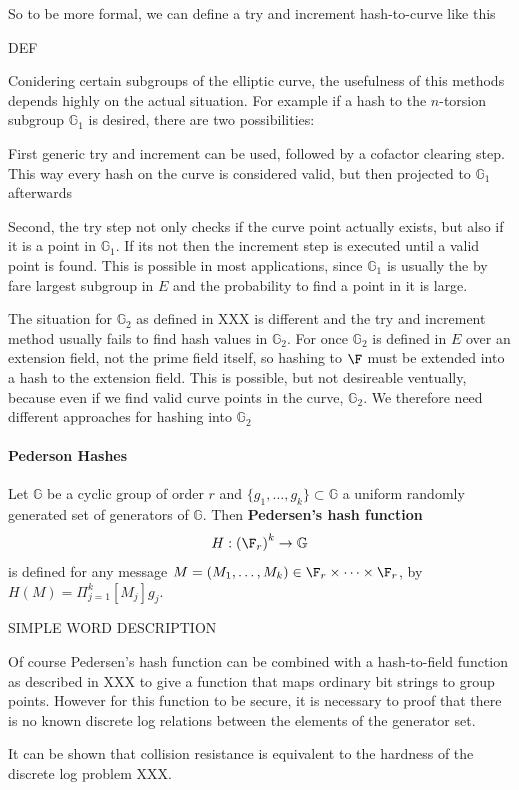 So to be more formal, we can define a try and increment hash-to-curve like this

DEF


Conidering certain subgroups of the elliptic curve, the usefulness of this methods depends highly on the actual situation. For example if a hash to the $n$-torsion subgroup $\mathbb{G}_1$ is desired, there are two possibilities: 

First generic try and increment can be used, followed by a cofactor clearing step. This way every hash on the curve is considered valid, but then projected to $\mathbb{G}_1$ afterwards 

Second, the try step not only checks if the curve point actually exists, but also if it is a point in $\mathbb{G}_1$. If its not then the increment step is executed until a valid point is found. This is possible in most applications, since $\mathbb{G}_1$ is usually the by fare largest subgroup in $E$ and the probability to find a point in it is large.

The situation for $\mathbb{G}_2$ as defined in XXX is different and the try and increment method usually fails to find hash values in $\mathbb{G}_2$. For once $\mathbb{G}_2$ is defined in $E$ over an extension field, not the prime field itself, so hashing to $\F$ must be extended into a hash to the extension field. This is possible, but not desireable ventually, because even if we find valid curve points in the curve, $\mathbb{G}_2$. We therefore need different approaches for hashing into $\mathbb{G}_2$

\paragraph{Pederson Hashes}
\begin{definition}
Let $\mathbb{G}$ be a cyclic group of order $r$ and $\{g_1, \ldots, g_k\} \subset \mathbb{G}$ a uniform randomly generated set of generators of $\mathbb{G}$. Then \textbf{Pedersen’s hash function} 
$$
H : \left(\F_r\right)^k \to \mathbb{G}
$$
is defined for any message $M = (M_1,\ldots,M_k)\in \F_r \times \cdots \times \F_r$, 
by $H(M) =\Pi_{j=1}^k [M_j]g_j$.
\end{definition}
SIMPLE WORD DESCRIPTION
\begin{remark} Of course Pedersen's hash function can be combined with a hash-to-field function as described in XXX to give a function that maps ordinary bit strings to group points. However
for this function to be secure, it is necessary to proof that there is no known discrete log relations between the elements of the generator set.

It can be shown that collision resistance is equivalent to the hardness of the discrete log problem XXX.
\end{remark}
\begin{example}

\end{example}

